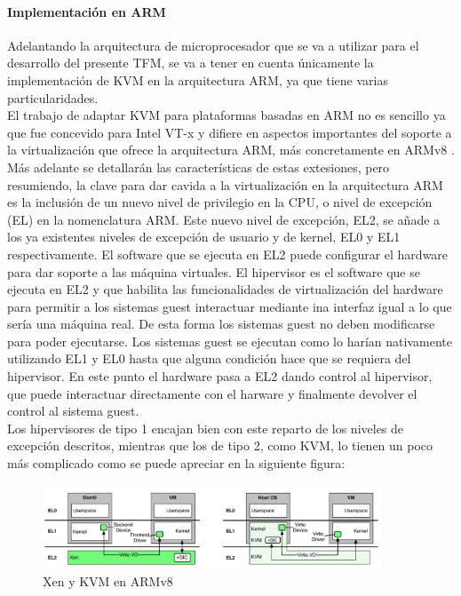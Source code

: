 \paragraph{Implementación en ARM}
Adelantando la arquitectura de microprocesador que se va a utilizar para el desarrollo del presente TFM, se va a tener en cuenta únicamente la implementación de KVM en la arquitectura ARM, ya que tiene varias particularidades.\\
El trabajo de adaptar KVM para plataformas basadas en ARM no es sencillo ya que fue concevido para Intel VT-x y difiere en aspectos importantes del soporte a la virtualización que ofrece la arquitectura ARM, más concretamente en ARMv8 \cite{kvm_1}.\\
Más adelante se detallarán las características de estas extesiones, pero resumiendo, la clave para dar cavida a la virtualización en la arquitectura ARM es la inclusión de un nuevo nivel de privilegio en la CPU, o nivel de excepción (EL) en la nomenclatura ARM. Este nuevo nivel de excepción, EL2, se añade a los ya existentes niveles de excepción de usuario y de kernel, EL0 y EL1 respectivamente.
El software que se ejecuta en EL2 puede configurar el hardware para dar soporte a las máquina virtuales. El hipervisor es el software que se ejecuta en EL2 y que habilita las funcionalidades de virtualización del hardware para permitir a los sistemas guest interactuar mediante ina interfaz igual a lo que sería una máquina real. De esta forma los sistemas guest no deben modificarse para poder ejecutarse. Los sistemas guest se ejecutan como lo harían nativamente utilizando EL1 y EL0 hasta que alguna condición hace que se requiera del hipervisor. En este punto el hardware pasa a EL2 dando control al hipervisor, que puede interactuar directamente con el harware y finalmente devolver el control al sistema guest.\\
Los hipervisores de tipo 1 encajan bien con este reparto de los niveles de excepción descritos, mientras que los de tipo 2, como KVM, lo tienen un poco más complicado como se puede apreciar en la siguiente figura:

\begin{figure}[!htb]
  \centering
  \includegraphics[width=0.90\textwidth]{recursos/kvm_xen_1.png}
  \caption{Xen y KVM en ARMv8}
  \label{fig:kvm_and_xen}
\end{figure}

